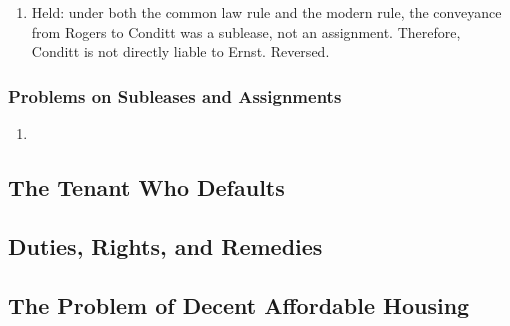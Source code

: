 \begin{enumerate}
\begin{enumerate}
        lessee's estate for the entire remainder of his term it is an 
        assignment, regardless of its form or the parties' intention. 
        Conversely, if the instrument purports to transfer the lessee's estate 
        for less than the entire term---even for a day less---it is a 
        sublease, regardless of its form or of the parties' 
        intention.''\footnote{Casebook p. 446.}
        \item Modern rule: follow the parties' intention.
    \end{enumerate}
    \item Held: under both the common law rule and the modern rule, the 
    conveyance from Rogers to Conditt was a sublease, not an assignment. 
    Therefore, Conditt is not directly liable to Ernst. Reversed.
\end{enumerate}

\subsubsection{Problems on Subleases and Assignments}

\begin{enumerate}
    \item %
\end{enumerate}


\subsection{The Tenant Who Defaults}


\subsection{Duties, Rights, and Remedies}


\subsection{The Problem of Decent Affordable Housing}

